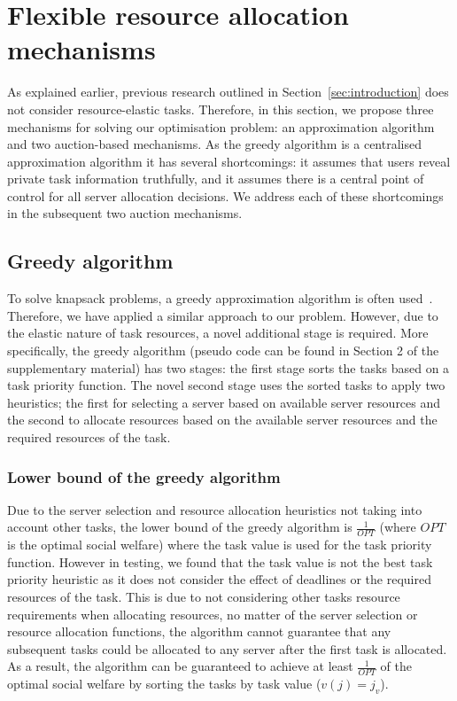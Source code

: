 \section{Flexible resource allocation mechanisms}
\label{sec:flexible-resource-allocation-mechanisms}
As explained earlier, previous research outlined in Section~\ref{sec:introduction} does not consider resource-elastic tasks. Therefore, in this section, we propose three mechanisms for solving our optimisation problem: an approximation algorithm and two auction-based mechanisms. As the greedy algorithm is a centralised approximation algorithm it has several shortcomings: it assumes that users reveal private task information truthfully, and it assumes there is a central point of control for all server allocation decisions. We address each of these shortcomings in the subsequent two auction mechanisms. 

\subsection{Greedy algorithm}
\label{subsec:greedy-algorithm}
To solve knapsack problems, a greedy approximation algorithm is often used~\cite{sahni1975approximate}. Therefore, we have applied a similar approach to our problem. However, due to the elastic nature of task resources, a novel additional stage is required. More specifically, the greedy algorithm (pseudo code can be found in Section 2 of the supplementary material) has two stages: the first stage sorts the tasks based on a task priority function. The novel second stage uses the sorted tasks to apply two heuristics; the first for selecting a server based on available server resources and the second to allocate resources based on the available server resources and the required resources of the task. %

\subsubsection{Lower bound of the greedy algorithm}
\label{subsubsec:greedy-lower-bound}
Due to the server selection and resource allocation heuristics not taking into account other tasks, the lower bound of the greedy algorithm is $\frac{1}{OPT}$ (where $OPT$ is the optimal social welfare) where the task value is used for the task priority function. However in testing, we found that the task value is not the best task priority heuristic as it does not consider the effect of deadlines or the required resources of the task. This is due to not considering other tasks resource requirements when allocating resources, no matter of the server selection or resource allocation functions, the algorithm cannot guarantee that any subsequent tasks could be allocated to any server after the first task is allocated. As a result, the algorithm can be guaranteed to achieve at least $\frac{1}{OPT}$ of the optimal social welfare by sorting the tasks by task value ($v(j) = j_v$).

